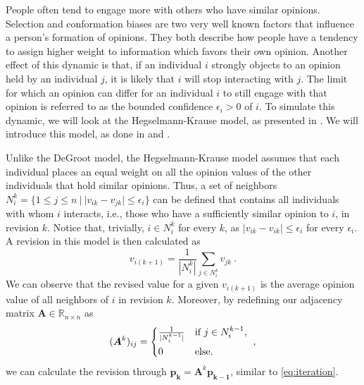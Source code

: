 \documentclass[journal,compsoc,10pt]{IEEEtran}
\newcommand{\RR}{\mathbb{R}}
\newcommand{\gG}{\mathcal{G}}
\renewcommand{\vec}[1]{\bm{#1}}        %
\newcommand{\mat}[1]{\bm{#1}}          %
\begin{document}
People often tend to engage more with others who have similar opinions. Selection and conformation biases are two very well known factors that influence a person's formation of opinions. They both describe how people have a tendency to assign higher weight to information which favors their own opinion. Another effect of this dynamic is that, if an individual $i$ strongly objects to an opinion held by an individual $j$, it is likely that $i$ will stop interacting with $j$. The limit for which an opinion can differ for an individual $i$ to still engage with that opinion is referred to as the bounded confidence $\epsilon_i > 0$ of $i$.
To simulate this dynamic, we will look at the Hegselmann-Krause model, as presented in \cite{Hegselmann-Krause}. We will introduce this model, as done in \cite{Krause} and \cite{Dittmer}. 

Unlike the DeGroot model, the Hegselmann-Krause model assumes that each individual places an equal weight on all the opinion values of the other individuals that hold similar opinions. Thus, a set of neighbors $ N_i^k = \{1 \leq j \leq n \ |\ |v_{ik} - v_{jk}| \leq \epsilon_i \}$ can be defined that contains all individuals with whom $i$ interacts, i.e., those who have a sufficiently similar opinion to $i$, in revision $k$. Notice that, trivially, $i \in N_i^k$ for every $k$, as $|v_{ik}-v_{ik}| \leq \epsilon_i$ for every $\epsilon_i$. 
A revision in this model is then calculated as
\begin{equation}\label{eq:revision_bounded_conf}
    v_{i(k+1)} = \frac{1}{|N_i^k|}\sum_{j\in N_i^k}v_{jk} \ .
\end{equation}
We can observe that the revised value for a given $v_{i(k+1)}$ is the average opinion value of all neighbors of $i$ in revision $k$.
Moreover, by redefining our adjacency matrix $\mat A \in \RR_{n\times n}$ as 
\[(\mat A^k)_{ij} = \begin{cases*}
\frac{1}{|N_i^{k-1}|} & if $j\in N_i^{k-1}$,\\
0 & else.
\end{cases*} \ ,\]
we can calculate the revision through $\vec{p_k} = \mat A^k \vec{p_{k-1}}$, similar to \cref{eq:iteration}.
\end{document}
